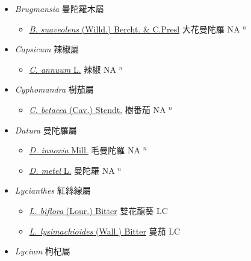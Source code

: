 
  \begin{itemize}
 \item[] \textit{Brugmansia} 曼陀羅木屬
                    
  \begin{itemize}
        \item[] \href{http://www.theplantlist.org/tpl1.1/search?q=Brugmansia+suaveolens}{\textit{B. suaveolens} (Willd.) Bercht. \& C.Presl}   大花曼陀羅 NA $^n$
  \end{itemize}
 \item[] \textit{Capsicum} 辣椒屬
                    
  \begin{itemize}
        \item[] \href{http://www.theplantlist.org/tpl1.1/search?q=Capsicum+annuum}{\textit{C. annuum} L.}   辣椒 NA $^n$
  \end{itemize}
 \item[] \textit{Cyphomandra} 樹茄屬
                    
  \begin{itemize}
        \item[] \href{http://www.theplantlist.org/tpl1.1/search?q=Cyphomandra+betacea}{\textit{C. betacea} (Cav.) Stendt.}   樹番茄 NA $^n$
  \end{itemize}
 \item[] \textit{Datura} 曼陀羅屬
                    
  \begin{itemize}
        \item[] \href{http://www.theplantlist.org/tpl1.1/search?q=Datura+innoxia}{\textit{D. innoxia} Mill.}   毛曼陀羅 NA $^n$
        \item[] \href{http://www.theplantlist.org/tpl1.1/search?q=Datura+metel}{\textit{D. metel} L.}   曼陀羅 NA $^n$
  \end{itemize}
 \item[] \textit{Lycianthes} 紅絲線屬
                    
  \begin{itemize}
        \item[] \href{http://www.theplantlist.org/tpl1.1/search?q=Lycianthes+biflora}{\textit{L. biflora} (Lour.) Bitter}   雙花龍葵 LC
        \item[] \href{http://www.theplantlist.org/tpl1.1/search?q=Lycianthes+lysimachioides}{\textit{L. lysimachioides} (Wall.) Bitter}   蔓茄 LC
  \end{itemize}
 \item[] \textit{Lycium} 枸杞屬
                    

\end{itemize}
